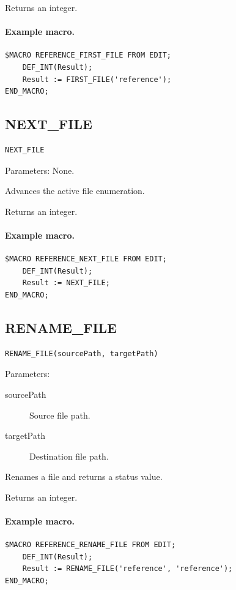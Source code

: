 \documentclass[a4paper,10pt,twoside,openany]{book}
\begin{document}
Returns an integer.

\paragraph{Example macro.}
\begin{verbatim}
$MACRO REFERENCE_FIRST_FILE FROM EDIT;
    DEF_INT(Result);
    Result := FIRST_FILE('reference');
END_MACRO;
\end{verbatim}

\label{prim:intrinsic-next-file}
\subsection*{NEXT\_FILE}
\begin{verbatim}
NEXT_FILE
\end{verbatim}
Parameters: None.

Advances the active file enumeration.

Returns an integer.

\paragraph{Example macro.}
\begin{verbatim}
$MACRO REFERENCE_NEXT_FILE FROM EDIT;
    DEF_INT(Result);
    Result := NEXT_FILE;
END_MACRO;
\end{verbatim}

\label{prim:intrinsic-rename-file}
\subsection*{RENAME\_FILE}
\begin{verbatim}
RENAME_FILE(sourcePath, targetPath)
\end{verbatim}
Parameters:
\begin{description}
\item[sourcePath] Source file path.
\item[targetPath] Destination file path.
\end{description}

Renames a file and returns a status value.

Returns an integer.

\paragraph{Example macro.}
\begin{verbatim}
$MACRO REFERENCE_RENAME_FILE FROM EDIT;
    DEF_INT(Result);
    Result := RENAME_FILE('reference', 'reference');
END_MACRO;
\end{verbatim}
\end{document}

